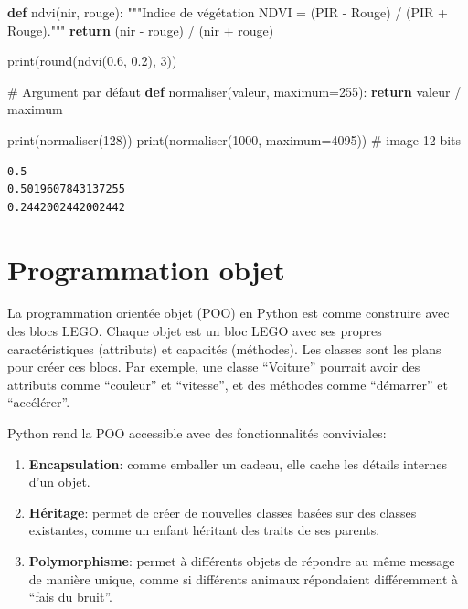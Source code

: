 \documentclass[
  french,
  11pt,
  letterpaper,
  open=any,
  twoside=false,
  french]{scrbook}
\newenvironment{Shaded}{\begin{snugshade}}{\end{snugshade}}
\newcommand{\BuiltInTok}[1]{\textcolor[rgb]{0.00,0.23,0.31}{#1}}
\newcommand{\CommentTok}[1]{\textcolor[rgb]{0.37,0.37,0.37}{#1}}
\newcommand{\ControlFlowTok}[1]{\textcolor[rgb]{0.00,0.23,0.31}{\textbf{#1}}}
\newcommand{\DecValTok}[1]{\textcolor[rgb]{0.68,0.00,0.00}{#1}}
\newcommand{\FloatTok}[1]{\textcolor[rgb]{0.68,0.00,0.00}{#1}}
\newcommand{\KeywordTok}[1]{\textcolor[rgb]{0.00,0.23,0.31}{\textbf{#1}}}
\newcommand{\NormalTok}[1]{\textcolor[rgb]{0.00,0.23,0.31}{#1}}
\newcommand{\OperatorTok}[1]{\textcolor[rgb]{0.37,0.37,0.37}{#1}}
\begin{document}
\begin{Shaded}
\begin{Highlighting}[]
\KeywordTok{def}\NormalTok{ ndvi(nir, rouge):}
    \CommentTok{"""Indice de végétation NDVI = (PIR {-} Rouge) / (PIR + Rouge)."""}
    \ControlFlowTok{return}\NormalTok{ (nir }\OperatorTok{{-}}\NormalTok{ rouge) }\OperatorTok{/}\NormalTok{ (nir }\OperatorTok{+}\NormalTok{ rouge)}

\BuiltInTok{print}\NormalTok{(}\BuiltInTok{round}\NormalTok{(ndvi(}\FloatTok{0.6}\NormalTok{, }\FloatTok{0.2}\NormalTok{), }\DecValTok{3}\NormalTok{))}

\CommentTok{\# Argument par défaut}
\KeywordTok{def}\NormalTok{ normaliser(valeur, maximum}\OperatorTok{=}\DecValTok{255}\NormalTok{):}
    \ControlFlowTok{return}\NormalTok{ valeur }\OperatorTok{/}\NormalTok{ maximum}

\BuiltInTok{print}\NormalTok{(normaliser(}\DecValTok{128}\NormalTok{))}
\BuiltInTok{print}\NormalTok{(normaliser(}\DecValTok{1000}\NormalTok{, maximum}\OperatorTok{=}\DecValTok{4095}\NormalTok{))   }\CommentTok{\# image 12 bits}
\end{Highlighting}
\end{Shaded}

\begin{verbatim}
0.5
0.5019607843137255
0.2442002442002442
\end{verbatim}

\section{Programmation objet}\label{programmation-objet}

La programmation orientée objet (POO) en Python est comme construire
avec des blocs LEGO. Chaque objet est un bloc LEGO avec ses propres
caractéristiques (attributs) et capacités (méthodes). Les classes sont
les plans pour créer ces blocs. Par exemple, une classe ``Voiture''
pourrait avoir des attributs comme ``couleur'' et ``vitesse'', et des
méthodes comme ``démarrer'' et ``accélérer''.

Python rend la POO accessible avec des fonctionnalités conviviales:

\begin{enumerate}
\def\labelenumi{\arabic{enumi}.}
\item
  \textbf{Encapsulation}: comme emballer un cadeau, elle cache les
  détails internes d'un objet.
\item
  \textbf{Héritage}: permet de créer de nouvelles classes basées sur des
  classes existantes, comme un enfant héritant des traits de ses
  parents.
\item
  \textbf{Polymorphisme}: permet à différents objets de répondre au même
  message de manière unique, comme si différents animaux répondaient
  différemment à ``fais du bruit''.
\end{enumerate}
\end{document}

